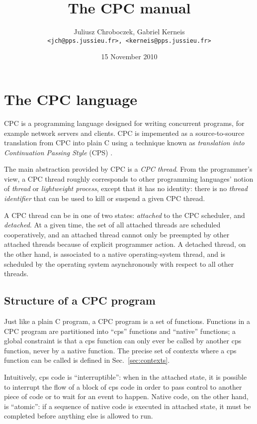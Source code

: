 \documentclass[a4paper]{report}
\title{The CPC manual}
\author{Juliusz Chroboczek, Gabriel Kerneis\\
{\tt <jch@pps.jussieu.fr>, <kerneis@pps.jussieu.fr>}}
\date{15 November 2010}
\begin{document}
\maketitle

\chapter{The CPC language} \label{chapter:language}

CPC is a programming language designed for writing concurrent programs, for
example network servers and clients.  CPC is impemented as a
source-to-source translation from CPC into plain C using a technique known
as {\em translation into Continuation Passing Style\/} (CPS)
\cite{strachey:continuations, plotkin:call-by-lambda}.

The main abstraction provided by CPC is a {\em CPC thread}.  From the
programmer's view, a CPC thread roughly corresponds to other programming
languages' notion of {\em thread\/} or {\em lightweight process}, except
that it has no identity: there is no {\em thread identifier\/} that can be
used to kill or suspend a given CPC thread.

A CPC thread can be in one of two states: {\em attached\/} to the CPC
scheduler, and {\em detached}.  At a given time, the set of all attached
threads are scheduled cooperatively, and an attached thread cannot only be
preempted by other attached threads because of explicit programmer action.
A detached thread, on the other hand, is associated to a native
operating-system thread, and is scheduled by the operating system
asynchronously with respect to all other threads.

\section{Structure of a CPC program}

Just like a plain C program, a CPC program is a set of functions.
Functions in a CPC program are partitioned into ``cps'' functions and
``native'' functions; a global constraint is that a cps function can
only ever be called by another cps function, never by a native
function.  The precise set of contexts where a cps function can be
called is defined in Sec.~\ref{sec:contexts}.

Intuitively, cps code is ``interruptible'': when in the attached state, it
is possible to interrupt the flow of a block of cps code in order to pass
control to another piece of code or to wait for an event to happen.  Native
code, on the other hand, is ``atomic'': if a sequence of native code is
executed in attached state, it must be completed before anything else is
allowed to run.
\end{document}
